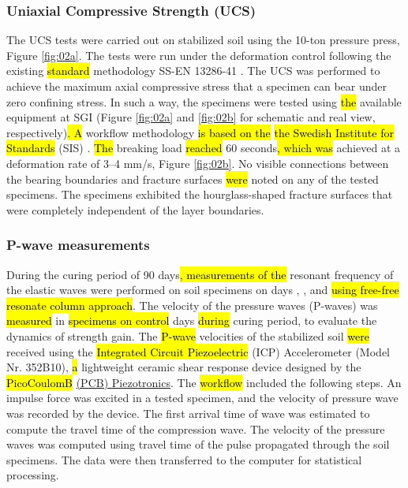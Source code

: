 \documentclass[materials,article,submit,pdftex,moreauthors]{Definitions/mdpi}
\begin{document}
\subsubsection{Uniaxial Compressive Strength (UCS)}
The UCS tests were carried out on stabilized soil using the 10-ton pressure press, Figure \ref{fig:02a}. The tests were run under the deformation control following the existing \hl{standard} methodology SS-EN 13286-41 \cite{SIS2003,SIS2018}. The UCS was performed to achieve the maximum axial compressive stress that a specimen can bear under zero confining stress. In such a way, the specimens were tested using \hl{the} available equipment at SGI (Figure \ref{fig:02a} and \ref{fig:02b} for schematic and real view, respectively)\hl{. A} workflow methodology \hl{is based on the} \hl{the Swedish Institute for Standards} (SIS) \cite{SIS2003,SIS2018}. \hl{The} breaking load \hl{reached} 60 seconds\hl{, which was} achieved at a deformation rate of 3--4 mm/s, Figure \ref{fig:02b}. No visible connections between the bearing boundaries and fracture surfaces \hl{were} noted on any of the tested specimens. The specimens exhibited the hourglass-shaped fracture surfaces that were completely independent of the layer boundaries. 

\subsubsection{P-wave measurements}
During the curing period of 90 days\hl{, measurements of the }resonant frequency of the elastic waves\hl{ }were performed on soil specimens on days , ,  and  \hl{using free-free resonate column approach}. The velocity of the pressure waves (P-waves) was \hl{measured} in \hl{specimens on control} days \hl{during} curing period, to evaluate the dynamics of strength gain. The \hl{P-wave} velocities of the stabilized soil \hl{were} received using the \hl{Integrated Circuit Piezoelectric} (ICP) Accelerometer (Model Nr. 352B10), \hl{a} lightweight ceramic shear response device designed by the \hl{PicoCoulomB} \href{https://www.pcb.com}{(PCB) Piezotronics}. The \hl{workflow} included the following steps. An impulse force was excited in a tested specimen, and the velocity of pressure wave was recorded by the device. The first arrival time of wave was estimated to compute the travel time of the compression wave. The velocity of the pressure waves was computed using travel time of the pulse propagated through the soil specimens. The data were then transferred to the computer for statistical processing.
\end{document}

